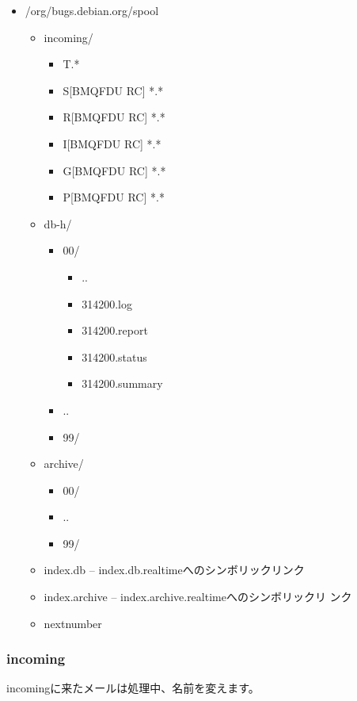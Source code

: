 \documentclass[mingoth,a4paper]{jsarticle}
\begin{document}
\begin{itemize}
 \item /org/bugs.debian.org/spool
       \begin{itemize}
	\item incoming/
	      \begin{itemize}
	       \item T.*
	       \item S[BMQFDU RC] *.*
	       \item R[BMQFDU RC] *.*
	       \item I[BMQFDU RC] *.*
	       \item G[BMQFDU RC] *.*
	       \item P[BMQFDU RC] *.*
	      \end{itemize}
	\item db-h/
	      \begin{itemize}
	       \item 00/
		     \begin{itemize}
		      \item ..
		      \item 314200.log
		      \item 314200.report
		      \item 314200.status
		      \item 314200.summary
		     \end{itemize}
	       \item ..
	       \item 99/
	      \end{itemize}
	\item archive/
	      \begin{itemize}
	       \item 00/
	       \item ..
	       \item 99/
	      \end{itemize}
	\item index.db -- index.db.realtimeへのシンボリックリンク
	\item index.archive -- index.archive.realtimeへのシンボリックリ
	      ンク
	\item nextnumber
       \end{itemize}
\end{itemize}

\subsubsection{incoming}

incomingに来たメールは処理中、名前を変えます。
\end{document}
